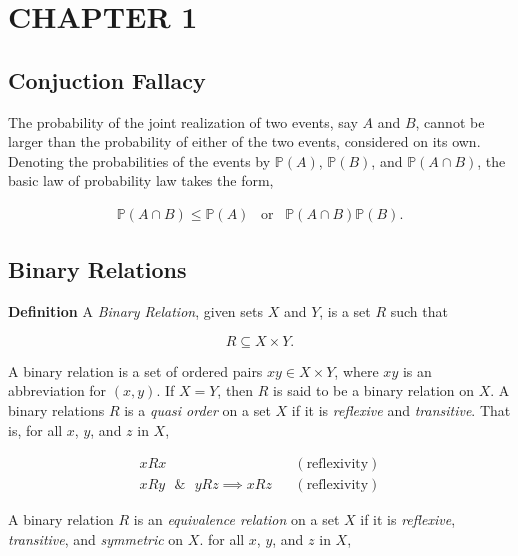 \documentclass[12pt]{article}
\begin{document}
\section*{CHAPTER 1}

\subsection*{Conjuction Fallacy}
\noindent
The probability of the joint realization of two events, say $A$ and $B$, cannot be larger than the probability of either of the two events, considered on its own. Denoting the probabilities of the events by $\mathbb{P}(A)$, $\mathbb{P}(B)$, and $\mathbb{P}(A \cap B)$, the basic law of probability law takes the form,

\begin{align*}
\mathbb{P}(A \cap B) \leq \mathbb{P}(A) \enspace \text{  or  } \enspace \mathbb{P}(A \cap B) \mathbb{P}(B).
\end{align*}

\subsection*{Binary Relations}
\noindent
\textbf{Definition} A \textit{Binary Relation}, given sets $X$ and $Y$, is a set $R$ such that

\begin{equation*}
R \subseteq X \times Y.
\end{equation*}

\noindent
A binary relation is a set of ordered pairs $xy \in X \times Y$, where $xy$ is an abbreviation for $(x,y)$. If $X=Y$, then $R$ is said to be a binary relation on $X$. A binary relations $R$ is a \textit{quasi order} on a set $X$ if it is \textit{reflexive} and \textit{transitive}. That is, for all $x$, $y$, and $z$ in $X$, 

\begin{align*}
xRx && (\text{reflexivity}) \\
xRy \text{ } \& \text{ } yRz \implies xRz && (\text{reflexivity})
\end{align*}

\noindent
A binary relation $R$ is an \textit{equivalence relation} on a set $X$ if it is \textit{reflexive}, \textit{transitive}, and \textit{symmetric} on $X$. for all $x$, $y$, and $z$ in $X$,
\end{document}
